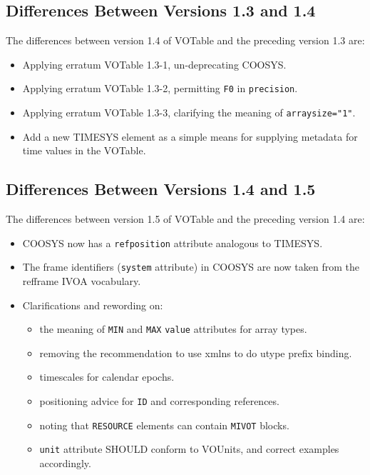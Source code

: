 \documentclass[11pt,a4paper]{ivoa}
\let\fg=\color
\def\attr#1{{\tt{\fg{DarkRed}#1}}}
\def\elem#1{{\tt{\fg{DarkRed}#1}}}
\def\attrval#1#2{{\tt{\fg{DarkRed}#1}="{\fg{DarkPurple}#2}"}}
\begin{document}
{{{\subsection{Differences Between Versions 1.3 and 1.4}
\label{diff1.3-1.4}
The differences between version 1.4 of VOTable and the preceding
version 1.3 are:

\begin{itemize}
\item Applying erratum VOTable 1.3-1, un-deprecating COOSYS.
\item Applying erratum VOTable 1.3-2, permitting \verb|F0| in
\attr{precision}.
\item Applying erratum VOTable 1.3-3, clarifying the meaning of
\attrval{arraysize}{1}.
\item Add a new TIMESYS element as a simple means for
     supplying metadata for time values in the VOTable.
\end{itemize}


\subsection{Differences Between Versions 1.4 and 1.5}
\label{diff1.4-1.5}
The differences between version 1.5 of VOTable and the preceding
version 1.4 are:

\begin{itemize}
\item COOSYS now has a \attr{refposition} attribute analogous to TIMESYS.
\item The frame identifiers (\attr{system} attribute) in COOSYS are now taken
from the refframe IVOA vocabulary.
\item Clarifications and rewording on:
  \begin{itemize}
    \item the meaning of \elem{MIN} and \elem{MAX} \attr{value} attributes for
    array types.
    \item removing the recommendation to use xmlns to do utype prefix binding.
    \item timescales for calendar epochs.
    \item positioning advice for \attr{ID} and corresponding references.
    \item noting that \elem{RESOURCE} elements can contain \elem{MIVOT} blocks.
    \item \attr{unit} attribute SHOULD conform to VOUnits,
          and correct examples accordingly.
  \end{itemize}
\end{itemize}


}}}
\end{document}
